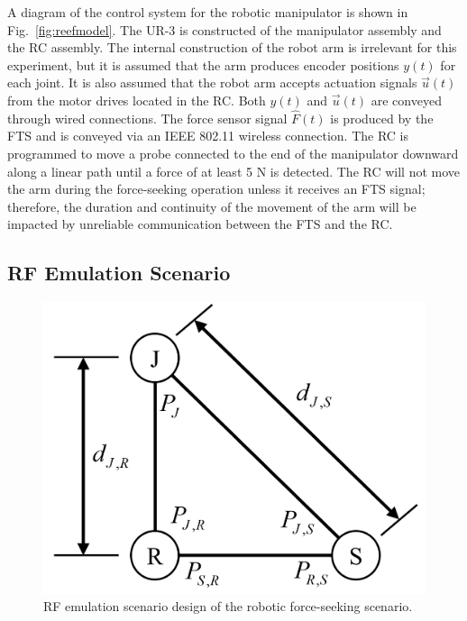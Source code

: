 A diagram of the control system for the robotic manipulator is shown in Fig.~\ref{fig:reefmodel}.  The UR-3 is constructed of the manipulator assembly and the RC assembly.  The internal construction of the robot arm is irrelevant for this experiment, but it is assumed that the arm produces encoder positions $y(t)$ for each joint.  It is also assumed that the robot arm accepts actuation signals $\vec{u}(t)$ from the motor drives located in the RC.  Both $y(t)$ and $\vec{u}(t)$ are conveyed through wired connections. The force sensor signal $\hat{F}(t)$ is produced by the FTS and is conveyed via an IEEE 802.11 wireless connection. The RC is programmed to move a probe connected to the end of the manipulator downward along a linear path until a force of at least 5 N is detected.  The RC will not move the arm during the force-seeking operation unless it receives an FTS signal; therefore, the duration and continuity of the movement of the arm will be impacted by unreliable communication between the FTS and the RC.

\subsection{RF Emulation Scenario}\label{sec:rfemulator}

\begin{figure}[tbp]
	\centering
	\includegraphics[width=0.5\columnwidth]{./chapter-ftml/diagrams/emulation-model}
	\caption{RF emulation scenario design of the robotic force-seeking scenario.}
	\label{fig:rf-emulation-scenario}
\end{figure}

